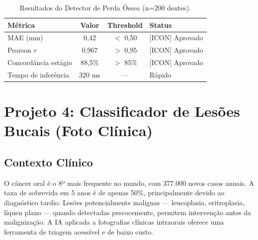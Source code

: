 \begin{table}[H]
  \centering
  \caption{Resultados do Detector de Perda Óssea (n=200 dentes).}
  \label{tab:boneloss-results}
  \begin{tabularx}{\textwidth}{lccX}
    \toprule
    \textbf{Métrica} & \textbf{Valor} & \textbf{Threshold} & \textbf{Status} \\
    \midrule
    MAE (mm) & 0,42 & $<$ 0,50 & \textcolor{corTesteSucesso}{[ICON] Aprovado} \\
    Pearson $r$ & 0,967 & $>$ 0,95 & \textcolor{corTesteSucesso}{[ICON] Aprovado} \\
    Concordância estágio & 88,5\% & $>$ 85\% & \textcolor{corTesteSucesso}{[ICON] Aprovado} \\
    Tempo de inferência & 320 ms & — & Rápido \\
    \bottomrule
  \end{tabularx}
\end{table}


\section{Projeto 4: Classificador de Lesões Bucais (Foto Clínica)}

\subsection{Contexto Clínico}

O câncer oral é o 8º mais frequente no mundo, com 377.000 novos casos
anuais. A taxa de sobrevida em 5 anos é de apenas 50\%, principalmente
devido ao diagnóstico tardio. Lesões potencialmente malignas — leucoplasia,
eritroplasia, líquen plano — quando detectadas precocemente, permitem
intervenção antes da malignização. A IA aplicada a fotografias clínicas
intraorais oferece uma ferramenta de triagem acessível e de baixo custo.


